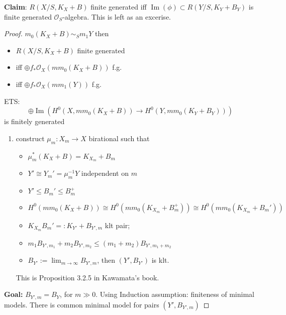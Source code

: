 \documentclass{article}
\begin{document}
\textbf{Claim}: $R(X/S,K_{X}+B)$ finite generated iff $\operatorname{Im}(\phi) \subset R(Y/S,K_{Y}+B_{Y})$ is finite generated $\mathcal{O}_{S}$-algebra. This is left as an excerise.
\begin{proof}
  $m_{0}(K_{X}+B)\sim _{S}m_{1}Y $ then 
\begin{itemize}
  \item $R(X/S,K_{X}+B)$ finite generated 
  \item iff $\oplus f_*\mathcal{O}_{X}(mm_0(K_{X}+B))$ f.g.
  \item iff $\oplus f_*\mathcal{O}_{X}(mm_1(Y))$ f.g.
\end{itemize}
ETS:  
\[
  \oplus \operatorname{Im}\left(H^{0}\left(X,mm_{0}\left(K_{X}+B\right)\right)\to H^{0}\left(Y,mm_{0}\left(K_{Y}+B_{Y}\right)\right)\right)
\]
is finitely generated
\begin{enumerate}[Step1]
  \item construct $\mu_{m}: X_{m}\to X$ birational such that 
    \begin{itemize}
      \item $\mu_{m}^*(K_{X}+B)=K_{X_{m}}+B_{m}$
      \item $Y'\cong Y_{m}'=\mu^{-1}_{m}Y$ independent on $m$
      \item $Y' \leqslant B_{m}' \leqslant  B_{m}^+$
      \item $H^0\left(mm_{0}\left(K_{X}+B\right)\right)\cong H^0(mm_{0}(K_{X_{m}}+B_{m}^+)) \cong H^0\left(mm_{0}\left(K_{X_{m}}+B_{m}'\right)\right) $
      \item $K_{X_{m}}B_{m}' =: K_{Y'}+B_{Y',m}$ klt pair;
      \item $m_{1}B_{Y',m_{1}}+m_{2}B_{Y',m_{2}}\leqslant \left(m_{1}+m_{2}\right)B_{Y',m_{1}+m_{2}}$
      \item $B_{Y'}:= \lim_{m \to \infty} B_{Y',m} $, then $(Y',B_{Y'})$ is klt.
    \end{itemize}
  This is Proposition 3.2.5 in Kawamata's book.
\end{enumerate}
\textbf{Goal:} $B_{Y',m}=B_{Y}$, for $m \gg 0$.
Using Induction assumption: finiteness of minimal models. There is common minimal model for pairs $(Y',B_{Y',m})$
\end{proof}
\end{document}

